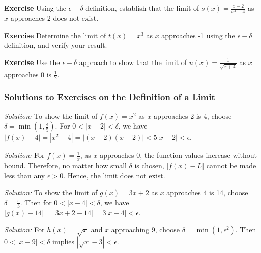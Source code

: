 \documentclass[a4paper,12pt]{book}
\newenvironment{exercise}[1][]
  {\par\medskip\noindent\textbf{Exercise #1} \rmfamily}
  {\medskip}
\newenvironment{solution}[1][]
{\par\noindent\textit{Solution:} \rmfamily}{\medskip}
\begin{document}
\begin{exercise}
Using the \(\epsilon-\delta\) definition, establish that the limit of \( s(x) = \frac{x - 2}{x^2 - 4} \) as \( x \) approaches 2 does not exist.
\end{exercise}

\begin{exercise}
Determine the limit of \( t(x) = x^3 \) as \( x \) approaches -1 using the \(\epsilon-\delta\) definition, and verify your result.
\end{exercise}

\begin{exercise}
Use the \(\epsilon-\delta\) approach to show that the limit of \( u(x) = \frac{1}{\sqrt{x + 4}} \) as \( x \) approaches 0 is \(\frac{1}{2}\).
\end{exercise}

\subsubsection*{Solutions to Exercises on the Definition of a Limit}

\begin{solution}[1]
To show the limit of \( f(x) = x^2 \) as \( x \) approaches 2 is 4, choose \(\delta = \min\left(1, \frac{\epsilon}{5}\right)\). For \( 0 < |x - 2| < \delta \), we have \( |f(x) - 4| = |x^2 - 4| = |(x - 2)(x + 2)| < 5|x - 2| < \epsilon \).
\end{solution}

\begin{solution}[2]
For \( f(x) = \frac{1}{x} \), as \( x \) approaches 0, the function values increase without bound. Therefore, no matter how small \(\delta\) is chosen, \( |f(x) - L| \) cannot be made less than any \(\epsilon > 0\). Hence, the limit does not exist.
\end{solution}

\begin{solution}[3]
To show the limit of \( g(x) = 3x + 2 \) as \( x \) approaches 4 is 14, choose \(\delta = \frac{\epsilon}{3}\). Then for \( 0 < |x - 4| < \delta \), we have \( |g(x) - 14| = |3x + 2 - 14| = 3|x - 4| < \epsilon \).
\end{solution}

\begin{solution}[4]
For \( h(x) = \sqrt{x} \) and \( x \) approaching 9, choose \(\delta = \min\left(1, \epsilon^2\right)\). Then \( 0 < |x - 9| < \delta \) implies \( |\sqrt{x} - 3| < \epsilon \).
\end{solution}
\end{document}
